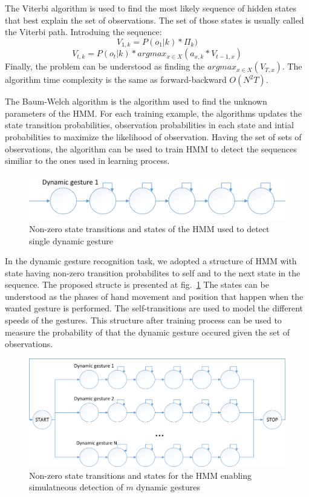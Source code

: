 The Viterbi algorithm is used to find the most likely sequence of hidden states that best explain the set of observations.
The set of those states is usually called the Viterbi path. 
Introduing the sequence:
\begin{equation}
V_{1,k} = P(o_1 | k) * \Pi_k)
\end{equation}
\begin{equation}
V_{t,k} = P(o_t | k) * argmax_{x\in X}(a_{x,k} * V_{t-1,x})
\end{equation}
Finally, the problem can be understood as finding the $argmax_{x\in X}(V_{T,x})$. 
The algorithm time complexity is the same as forward-backward $O(N^2 T)$.

The Baum-Welch algorithm is the algorithm used to find the unknown parameters of the HMM.
For each training example, the algorithms updates the state transition probabilities, observation probabilities in each state and intial probabilities to maximize the likelihood of observation.
Having the set of sets of observations, the algorithm can be used to train HMM to detect the sequences similiar to the ones used in learning process.

\begin{figure}[htb]
\centering
 \includegraphics[width=1\columnwidth]{figures/SingleHMM.png}
 \caption{Non-zero state transitions and states of the HMM used to detect single dynamic gesture}
 \label{singlehmm}
\end{figure}

In the dynamic gesture recognition task, we adopted a structure of HMM with state having non-zero transition probabilites to self and to the next state in the sequence.
The proposed structe is presented at fig.~\ref{singlehmm} 
The states can be understood as the phases of hand movement and position that happen when the wanted gesture is performed.
The self-transitions are used to model the different speeds of the gestures.
This structure after training process can be used to measure the probability of that the dynamic gesture occured given the set of observations.

\begin{figure}[htb]
\centering
 \includegraphics[width=1\columnwidth]{figures/HMM_eng.png}
 \caption{Non-zero state transitions and states for the HMM enabling simulatneous detection of $m$ dynamic gestures}
 \label{HMMstructure}
\end{figure}

